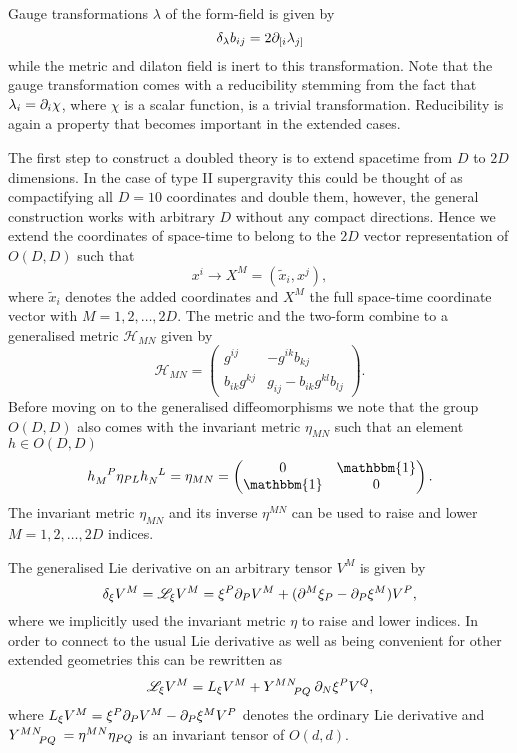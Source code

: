 Gauge transformations $\lambda$ of the form-field is given by 
\begin{equation}
    \delta_\lambda b_{ij} = 2\partial_{[i}\lambda_{j]} 
\end{equation}
while the metric and dilaton field is inert to this transformation. Note that the gauge transformation comes with a reducibility stemming from the fact that $\lambda_i = \partial_i \chi$, where $\chi$ is a scalar function, is a trivial transformation. Reducibility is again a property that becomes important in the extended cases. 

The first step to construct a doubled theory is to extend spacetime from $D$ to $2D$ dimensions. In the case of type II supergravity this could be thought of as compactifying all $D=10$ coordinates and double them, however, the general construction works with arbitrary $D$ without any compact directions. Hence we extend the coordinates of space-time to belong to the $2D$ vector representation of $O(D,D)$ such that 
\begin{equation}
    x^{i}\to X^M = (\tilde{x}_i,x^j),
\end{equation}
where $\tilde{x}_i$ denotes the added coordinates and $X^M$ the full space-time coordinate vector with $M=1,2,\ldots,2D$. The metric and the two-form combine to a generalised metric $\mathcal{H}_{MN}$ given by 
\begin{equation}
    \mathcal{H}_{MN} = \begin{pmatrix}g^{ij} & -g^{ik}b_{kj}\\
                            b_{ik}g^{kj} & g_{ij}-b_{ik}g^{kl}b_{lj}\end{pmatrix}.
\end{equation}
Before moving on to the generalised diffeomorphisms we note that the group $O(D,D)$ also comes with the invariant metric $\eta_{MN}$ such that an element $h\in O(D,D)$
\begin{equation}
\tensor{h}{_M^P}\eta_{PL}\tensor{h}{_N^L} = \eta_{MN} = \begin{pmatrix}0&\mathbbm{1}\\ \mathbbm{1}&0\end{pmatrix}.
\end{equation}
The invariant metric $\eta_{MN}$ and its inverse $\eta^{MN}$ can be used to raise and lower $M=1,2,\ldots,2D$ indices. 

The generalised Lie derivative on an arbitrary tensor $V^M$ is given by 
\begin{equation}
    \delta_\xi V^M = \mathscr{L}_\xi V^M = \xi^P\partial_P V^M+(\partial^M \xi_P-\partial_P\xi^M)V^P,
\end{equation}
where we implicitly used the invariant metric $\eta$ to raise and lower indices. In order to connect to the usual Lie derivative as well as being convenient for other extended geometries this can be rewritten as 
\begin{equation}
    \mathscr{L}_\xi V^M = L_\xi V^M + \tensor{Y}{^M^N_P_Q}\pd_N\xi^PV^Q,
\end{equation}
where $L_\xi V^M=\xi^P\partial_PV^M-\partial_P\xi^M V^P$ denotes the ordinary Lie derivative and $\tensor{Y}{^M^N_P_Q}=\eta^{MN}\eta_{PQ}$ is an invariant tensor of $O(d,d)$. 


